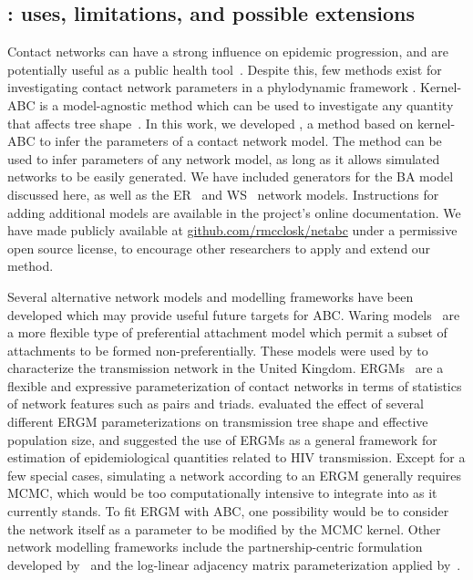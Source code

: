 

\label{sec:disc}

\subsection{: uses, limitations, and possible extensions}


Contact networks can have a strong influence on epidemic progression, and are
potentially useful as a public health tool~\autocite{wang2015targeting,
little2014using}. Despite this, few methods exist for investigating contact
network parameters in a phylodynamic framework \autocite[although see][for
related work]{groendyke2011bayesian, volz2008sir, brown2011transmission,
leventhal2012inferring, greenbaum2016inference}. Kernel-ABC is a model-agnostic
method which can be used to investigate any quantity that affects tree
shape~\autocite{poon2015phylodynamic}. In this work, we developed
, a method based on kernel-ABC to infer the parameters of a
contact network model. The method  can be used
to infer parameters of any network model, as long as it allows simulated
networks to be easily generated. We have included generators for the \gls{BA}
model discussed here, as well as the \gls{ER}~\autocite{erdos1960evolution} and
\gls{WS}~\autocite{watts1998collective} network models.  Instructions for
adding additional models are available in the project's online documentation.
We have made  publicly available at
\url{github.com/rmcclosk/netabc} under a permissive open source license, to
encourage other researchers to apply and extend our method.

Several alternative network models and modelling frameworks have been developed
which may provide useful future targets for \gls{ABC}. Waring
models~\autocite{irwin1963place,handcock2004likelihood} are a more flexible
type of preferential attachment model which permit a subset of attachments to
be formed non-preferentially. These models were used by
\textcite{brown2011transmission} to characterize the transmission network in
the United Kingdom. \Glspl{ERGM}~\autocite{robins2007introduction} are a
flexible and expressive parameterization of contact networks in terms of
statistics of network features such as pairs and triads.
\textcite{goodreau2006assessing} evaluated the effect of several different
\gls{ERGM} parameterizations on transmission tree shape and effective
population size, and suggested the use of \glspl{ERGM} as a general framework
for estimation of epidemiological quantities related to \gls{HIV} transmission.
Except for a few special cases, simulating a network according to an \gls{ERGM}
generally requires \gls{MCMC}, which would be too computationally intensive to
integrate into  as it currently stands. To fit \gls{ERGM} with
\gls{ABC}, one possibility would be to consider the network
itself as a parameter to be modified by the \gls{MCMC} kernel.  Other network
modelling frameworks include the partnership-centric formulation developed
by~\textcite{eames2002modeling} and the log-linear adjacency matrix
parameterization applied by~\textcite{morris1993epidemiology}.

